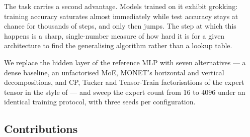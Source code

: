 The task carries a second advantage. Models trained on it exhibit grokking:
training accuracy saturates almost immediately while test accuracy stays at
chance for thousands of steps, and only then jumps. The step at which this
happens is a sharp, single-number measure of how hard it is for a given
architecture to find the generalising algorithm rather than a lookup table.

We replace the hidden layer of the reference MLP with seven alternatives ---
a dense baseline, an unfactorised MoE, MONET's horizontal and vertical
decompositions, and CP, Tucker and Tensor-Train factorisations of the expert
tensor in the style of \citet{oldfield2024mumoe} --- and sweep the expert
count from $16$ to $4096$ under an identical training protocol, with three
seeds per configuration.

\subsection{Contributions}

